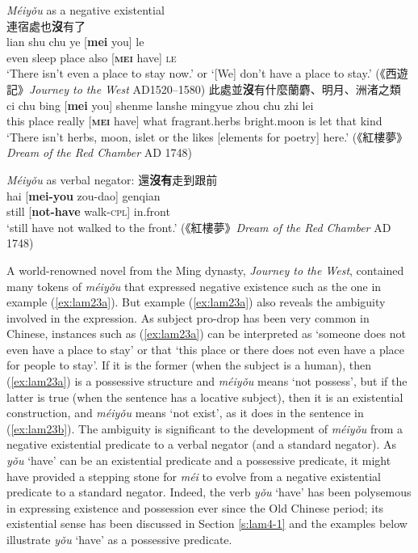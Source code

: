 \documentclass[output=paper]{langscibook}
\begin{document}
\ea \textit{Méiyǒu} as a negative existential \label{ex:lam23}\\
  \ea 連宿處也\textbf{沒}有了 \label{ex:lam23a}\\
  	\gll lian shu chu ye [\textbf{mei} you] le\\ 
  	even sleep place also [\textbf{\textsc{mei}} have] \textsc{le}\\
  	\glt `There isn't even a place to stay now.' or `[We] don't have a place to stay.' (《西遊記》\emph{Journey to the West} AD1520–1580)
  \ex 此處並\textbf{沒}有什麼蘭麝、明月、洲渚之類 \label{ex:lam23b}\\
  	\gll ci chu bing [\textbf{mei} you] shenme lanshe mingyue zhou chu zhi lei\\
  	this	 place really [\textbf{\textsc{mei}} have] what fragrant.herbs bright.moon is let that kind\\ 
  	\glt `There isn't herbs, moon, islet or the likes [elements for poetry] here.' (《紅樓夢》\emph{Dream of the Red Chamber} AD 1748)
\z \z


\ea \textit{Méiyǒu} as verbal negator: 還\textbf{沒有}走到跟前 \label{ex:lam24}\\
  \gll hai [\textbf{mei-you} zou-dao] genqian\\
  still [\textbf{not-have} walk-\textsc{cpl}] in.front\\
  \glt `still have not walked to the front.' (《紅樓夢》\emph{Dream of the Red Chamber} AD 1748)
\z


A world-renowned novel from the Ming dynasty, \emph{Journey to the West}, contained many tokens of \textit{méiyǒu} that expressed negative existence such as the one in example (\ref{ex:lam23a}). But example (\ref{ex:lam23a}) also reveals the ambiguity involved in the expression. As subject pro-drop has been very common in Chinese, instances such as (\ref{ex:lam23a}) can be interpreted as `someone does not even have a place to stay' or that `this place or there does not even have a place for people to stay'. If it is the former (when the subject is a human), then (\ref{ex:lam23a}) is a possessive structure and \textit{méiyǒu} means `not possess', but if the latter is true (when the sentence has a locative subject), then it is an existential construction, and \textit{méiyǒu} means `not exist', as it does in the sentence in (\ref{ex:lam23b}). The ambiguity is significant to the development of \textit{méiyǒu} from a negative existential predicate to a verbal negator (and a standard negator). As \textit{yǒu} `have' can be an existential predicate and a possessive predicate, it might have provided a stepping stone for \textit{méi} to evolve from a negative existential predicate to a standard negator. Indeed, the verb \textit{yǒu} `have' has been polysemous in expressing existence and possession ever since the Old Chinese period; its existential sense has been discussed in Section \ref{s:lam4-1} and the examples below illustrate \textit{yǒu} `have' as a possessive predicate. 
\end{document}
